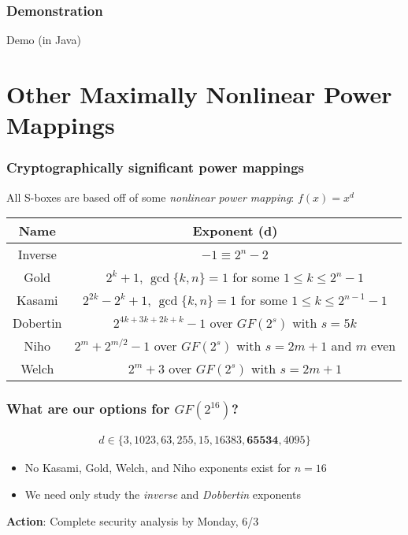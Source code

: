 \documentclass[handout]{beamer}
\begin{document}
\begin{frame}
	\frametitle{Demonstration}
	\begin{center}
		Demo (in Java)
	\end{center}
\end{frame}

\section{Other Maximally Nonlinear Power Mappings}
\begin{frame}
	\frametitle{Cryptographically significant power mappings}
	All S-boxes are based off of some \emph{nonlinear power mapping}: $f(x) = x^d$

	\begin{tabular}{c || c }
    \hline
    \textbf{Name} & \textbf{Exponent} (d)  \\ \hline
    Inverse & $-1 \equiv 2^n - 2$  \\ \hline
    Gold & $2^{k} + 1$, $\gcd\{k,n\} = 1$ for some $1 \leq k \leq 2^{n} - 1$  \\ \hline
    Kasami & $2^{2k} - 2^k + 1$, $\gcd\{k,n\} = 1$ for some $1 \leq k \leq 2^{n-1} - 1$ \\ \hline
    Dobertin & $2^{4k + 3k + 2k + k} - 1$ over $GF(2^s)$ with $s = 5k$  \\ \hline
    Niho & $2^{m} + 2^{m/2} - 1$ over $GF(2^s)$ with $s = 2m + 1$ and $m$ even  \\ \hline
    Welch & $2^m + 3$ over $GF(2^s)$ with $s = 2m + 1$  \\ \hline
    \end{tabular}
\end{frame}

\begin{frame}
	\frametitle{What are our options for $GF(2^{16})$?}
	\begin{align*}
	d \in \{3, 1023, 63, 255, 15, 16383, \mathbf{65534}, 4095\}
	\end{align*}
	\begin{itemize}
		\item No Kasami, Gold, Welch, and Niho exponents exist for $n = 16$
		\item We need only study the \emph{inverse} and \emph{Dobbertin} exponents
	\end{itemize}

	\medskip

	\textbf{Action}: Complete security analysis by Monday, 6/3
\end{frame}
\end{document}
